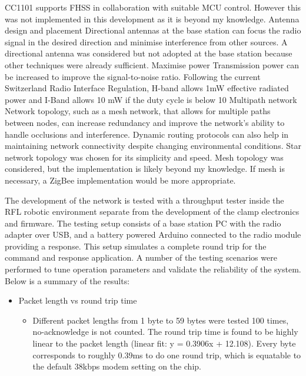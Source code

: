 \begin{itemize}
CC1101 supports FHSS in collaboration with suitable MCU control. However this was not implemented in this development as it is beyond my knowledge.
Antenna design and placement
Directional antennas at the base station can focus the radio signal in the desired direction and minimise interference from other sources. 
A directional antenna was considered but not adopted at the base station because other techniques were already sufficient.
Maximise power
Transmission power can be increased to improve the signal-to-noise ratio. 
Following the current Switzerland
Radio Interface Regulation, 
H-band allows 1mW effective
radiated power and I-Band allows 10 mW if the duty cycle is below 10%
Multipath network
Network topology, such as a mesh network, that allows for multiple paths between nodes, can increase redundancy and improve the network's ability to handle occlusions and interference. Dynamic routing protocols can also help in maintaining network connectivity despite changing environmental conditions.
Star network topology was chosen for its simplicity and speed. Mesh topology was considered, but the implementation is likely beyond my knowledge. If mesh is necessary, a ZigBee implementation would be more appropriate.


The development of the network is tested with a throughput tester inside the RFL robotic environment separate from the development of the clamp electronics and firmware. The testing setup consists of a base station PC with the radio adapter over USB, and a battery powered Arduino connected to the radio module providing a response. This setup simulates a complete round trip for the command and response application. A number of the testing scenarios were performed to tune operation parameters and validate the reliability of the system. Below is a summary of the results:
\begin{itemize}
\item Packet length vs round trip time
    \begin{itemize}
    \item Different packet lengths from 1 byte to 59 bytes were tested 100 times, no-acknowledge is not counted. The round trip time is found to be highly linear to the packet length (linear fit: y = 0.3906x + 12.108). Every byte corresponds to roughly 0.39ms to do one round trip, which is equatable to the default 38kbps modem setting on the chip. 


\end{itemize}
\end{itemize}
\end{itemize}
